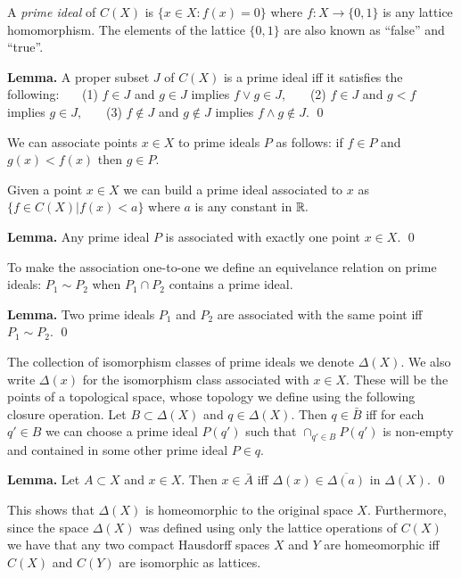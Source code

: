 \documentclass[11pt]{article}
\begin{document}
A \emph{prime ideal} of $C(X)$ is $\{x\in X:f(x)=0\}$ where $f:X\to \{0,1\}$
is any lattice homomorphism. 
The elements of the lattice $\{0, 1\}$ are also known as 
``false'' and ``true''.

{\bf Lemma.} A proper subset $J$ of $C(X)$ is a prime ideal
iff it satisfies the following:\newline
\ \ \ (1) $f\in J$ and $g\in J$ implies $f\vee g \in J,$ \newline
\ \ \ (2) $f\in J$ and $g<f$ implies $g\in J,$ \newline
\ \ \ (3) $f\notin J$ and $g\notin J$ implies $f\wedge g\notin J.$
\qed

We can associate points $x\in X$ to prime ideals $P$ as follows:
if $f\in P$ and $g(x)< f(x)$ then $g\in P.$

Given a point $x\in X$ we can build a prime ideal associated to $x$
as $\{f\in C(X) | f(x)<a\}$ where $a$ is any constant in $\mathbb R.$

{\bf Lemma.} Any prime ideal $P$ is associated with exactly one point $x\in X.$
\qed

To make the association one-to-one we
define an equivelance relation on prime ideals:
$P_1\sim P_2$ when $P_1\cap P_2$ contains a prime ideal.

{\bf Lemma.} Two prime ideals $P_1$ and $P_2$ are associated with the same
point iff $P_1\sim P_2.$
\qed

The collection of isomorphism classes of prime ideals we denote $\Delta(X).$
We also write $\Delta(x)$ for the isomorphism class associated with $x\in X.$
These will be the points of a topological space, whose topology we
define using the following closure operation.
Let $B\subset\Delta(X)$ and $q\in\Delta(X).$
Then $q\in\bar{B}$ iff 
for each $q'\in B$
we can choose a prime ideal $P(q')$ such that
$\cap_{q'\in B} P(q')$ is non-empty and contained in some other prime ideal $P\in q.$

{\bf Lemma.} Let $A\subset X$ and $x\in X$. Then $x\in\bar{A}$ iff
$\Delta(x)\in\overline{\Delta(a)}$ in $\Delta(X).$
\qed

This shows that $\Delta(X)$ is homeomorphic to the original space $X.$
Furthermore, since the space $\Delta(X)$
was defined using only the lattice operations of $C(X)$ we have that
any two compact Hausdorff spaces $X$ and $Y$ are homeomorphic iff $C(X)$ and
$C(Y)$ are isomorphic as lattices.
\end{document}
